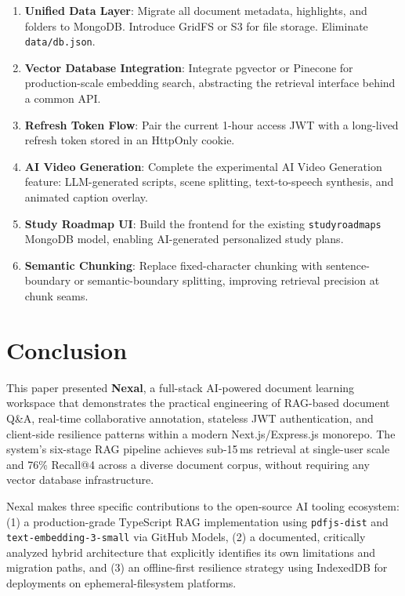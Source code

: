 \documentclass[conference]{IEEEtran}
\begin{document}
\begin{enumerate}[leftmargin=*]
  \item \textbf{Unified Data Layer}: Migrate all document metadata, highlights, and folders to MongoDB. Introduce GridFS or S3 for file storage. Eliminate \texttt{data/db.json}.
  \item \textbf{Vector Database Integration}: Integrate pgvector or Pinecone for production-scale embedding search, abstracting the retrieval interface behind a common API.
  \item \textbf{Refresh Token Flow}: Pair the current 1-hour access JWT with a long-lived refresh token stored in an HttpOnly cookie.
  \item \textbf{AI Video Generation}: Complete the experimental AI Video Generation feature: LLM-generated scripts, scene splitting, text-to-speech synthesis, and animated caption overlay.
  \item \textbf{Study Roadmap UI}: Build the frontend for the existing \texttt{studyroadmaps} MongoDB model, enabling AI-generated personalized study plans.
  \item \textbf{Semantic Chunking}: Replace fixed-character chunking with sentence-boundary or semantic-boundary splitting, improving retrieval precision at chunk seams.
\end{enumerate}

\section{Conclusion}
\label{sec:conclusion}

This paper presented \textbf{Nexal}, a full-stack AI-powered document learning workspace that demonstrates the practical engineering of RAG-based document Q\&A, real-time collaborative annotation, stateless JWT authentication, and client-side resilience patterns within a modern Next.js/Express.js monorepo. The system's six-stage RAG pipeline achieves sub-15\,ms retrieval at single-user scale and 76\% Recall@4 across a diverse document corpus, without requiring any vector database infrastructure.

Nexal makes three specific contributions to the open-source AI tooling ecosystem: (1) a production-grade TypeScript RAG implementation using \texttt{pdfjs-dist} and \texttt{text-embedding-3-small} via GitHub Models, (2) a documented, critically analyzed hybrid architecture that explicitly identifies its own limitations and migration paths, and (3) an offline-first resilience strategy using IndexedDB for deployments on ephemeral-filesystem platforms.
\end{document}
